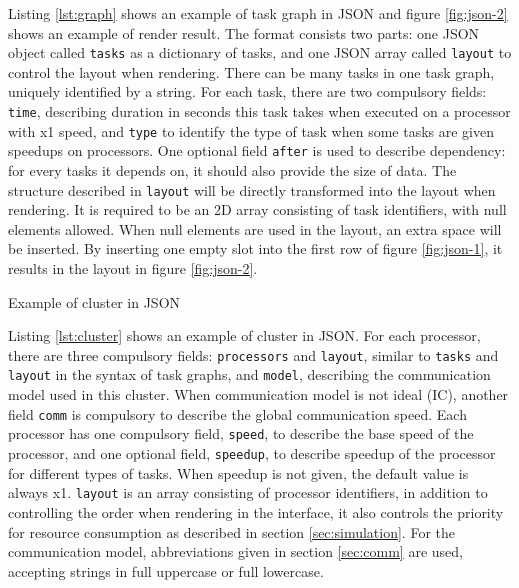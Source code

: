 \documentclass[msc,deptreport, cs]{infthesis}
\begin{document}
Listing \ref{lst:graph} shows an example of task graph in JSON and figure \ref{fig:json-2} shows an example of render result. The format consists two parts: one JSON object called \verb+tasks+ as a dictionary of tasks, and one JSON array called \verb+layout+ to control the layout when rendering. There can be many tasks in one task graph, uniquely identified by a string. For each task, there are two compulsory fields: \verb+time+, describing duration in seconds this task takes when executed on a processor with x1 speed, and \verb+type+ to identify the type of task when some tasks are given speedups on processors. One optional field \verb+after+ is used to describe dependency: for every tasks it depends on, it should also provide the size of data. The structure described in \verb+layout+ will be directly transformed into the layout when rendering. It is required to be an 2D array consisting of task identifiers, with null elements allowed. When null elements are used in the layout, an extra space will be inserted. By inserting one empty slot into the first row of figure \ref{fig:json-1}, it results in the layout in figure \ref{fig:json-2}. 

\vspace{0.5em}
\begin{lstfloat}
  
  \caption{Example of cluster in JSON}
  \label{lst:cluster}
  \vspace{-1em}
\end{lstfloat}
\vspace{-0.5em}

Listing \ref{lst:cluster} shows an example of cluster in JSON. For each processor, there are three compulsory fields: \verb+processors+ and \verb+layout+, similar to \verb+tasks+ and \verb+layout+ in the syntax of task graphs, and \verb+model+, describing the communication model used in this cluster. When communication model is not ideal (IC), another field \verb+comm+ is compulsory to describe the global communication speed. Each processor has one compulsory field, \verb+speed+, to describe the base speed of the processor, and one optional field, \verb+speedup+, to describe speedup of the processor for different types of tasks. When speedup is not given, the default value is always x1. \verb+layout+ is an array consisting of processor identifiers, in addition to controlling the order when rendering in the interface, it also controls the priority for resource consumption as described in section \ref{sec:simulation}. For the communication model, abbreviations given in section \ref{sec:comm} are used, accepting strings in full uppercase or full lowercase.
\end{document}
